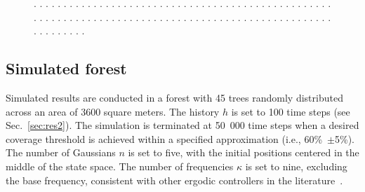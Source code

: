 \documentclass[letterpaper,10pt,conference,twoside]{IEEEtran}
\theoremstyle{definition}
\begin{document}
\begin{figure}[t!]
  \begin{minipage}[t!]{.67\columnwidth}
    \hspace*{.1cm}
  \end{minipage}\hspace*{.6cm}
  \begin{minipage}[t!]{.25\columnwidth}
    \caption[.]{\textbf{.   }.   .   .   .   .   .   .   .   .   .   .   .   .   .   .   .   .   .   .   .   .   .   .   .   .   .   .   .   .   .   .   .   .   .   .   .   .   .   .   .   .   .   .   .   .   .   .   .   .   .   .   .   .   .   .   .   .   .   .   .   .   .   .   .   .   .   .   .   .   .   .   .   .   .   .   .   .   .   .   .   .   .   .   .   .   .   .   .   .   .   .   .   .   .   .   .   .   .   .   .   .   .   .   .   .   .   .   .   .   .   .   .   .   .   .   .   .   .   .   .   .   .   .   .   .   .   .   .   .   .   .   .   .   .   .   .   .   .   .   .   .   .   .   .   .   .   .   .   .   .   .   .   .   .   .   .   .   .   .   .   .   .   .   .   .   .   .   .   .   .   .   .   .   .   .   .   .   .   .   .   .   .   .   .   .   .   .   .   .   .   .   .   .   .   .   .   .   .   .   .   .   .   .   .   .   .   .   .   .   .   .   .   .   .   .   .   .   .   .   .   .   .   .   .   .   .   .   .   .   .   .   .   .   .   .   .   .   .   .   .   .   .   .}
    \vspace*{-.2cm}
    \label{fig:2}
  \end{minipage}
  \vspace*{-.2cm}
  \caption*{\footnotesize .   .   .   .   .   .   .   .   .   .   .   .   .   .   .   .   .   .   .   .   .   .   .   .   .   .   .   .   .   .   .   .   .   .   .   .   .   .   .   .   .   .   .   .   .   .   .   .   .   .   .   .   .   .   .   .   .   .   .   .   .   .   .   .   .   .   .   .   .   .   .   .   .   .   .   .   .   .   .   .   .   .   .   .   .   .   .   .   .   .   .   .   .   .   .   .   .   .   .   .   .   .   .   .   .   .   .   .   .}
\end{figure}

\subsection{Simulated forest}\label{sec:res1}
\noindent
Simulated results are conducted in a forest with 45 trees randomly distributed across an area of 3600 square meters. The history $h$ is set to 100 time steps (see Sec.~\ref{sec:res2}). The simulation is terminated at 50~000 time steps when a desired coverage threshold is achieved within a specified approximation (i.e., 60\%~$\pm$5\%). The number of Gaussians $n$ is set to five, with the initial positions centered in the middle of the state space. The number of frequencies $\kappa$ is set to nine, excluding the base frequency, consistent with other ergodic controllers in the literature~\cite{seewald2024energy}. 
\end{document}
